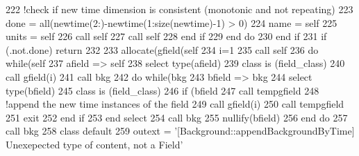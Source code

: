 \begin{DoxyCode}
222                 \textcolor{comment}{!check if new time dimension is consistent (monotonic and not repeating)}
223                 done = all(newtime(2:)-newtime(1:\textcolor{keyword}{size}(newtime)-1) > 0)
224                 name = self%
225                 units = self%
226                 \textcolor{keyword}{call }self%
227                 \textcolor{keyword}{call }self%
228 \textcolor{keywordflow}{            end if}
229 \textcolor{keywordflow}{        end do}
230 \textcolor{keywordflow}{    end if}
231     \textcolor{keywordflow}{if} (.not.done) \textcolor{keywordflow}{return}
232 
233     \textcolor{keyword}{allocate}(gfield(self%
234     i=1
235     \textcolor{keyword}{call }self%
236     \textcolor{keywordflow}{do} \textcolor{keywordflow}{while}(self%
237         afield => self%
238         \textcolor{keywordflow}{select type}(afield)
239 \textcolor{keywordflow}{        class is} (field\_class)
240             \textcolor{keyword}{call }gfield(i)%
241             \textcolor{keyword}{call }bkg%
242             \textcolor{keywordflow}{do} \textcolor{keywordflow}{while}(bkg%
243                 bfield => bkg%
244                 \textcolor{keywordflow}{select type}(bfield)
245 \textcolor{keywordflow}{                class is} (field\_class)
246                     \textcolor{keywordflow}{if} (bfield%
247                         \textcolor{keyword}{call }tempgfield%
248                         \textcolor{comment}{!append the new time instances of the field}
249                         \textcolor{keyword}{call }gfield(i)%
250                         \textcolor{keyword}{call }tempgfield%
251                         \textcolor{keywordflow}{exit}
252 \textcolor{keywordflow}{                    end if}
253 \textcolor{keywordflow}{                end select}
254                 \textcolor{keyword}{call }bkg%
255                 \textcolor{keyword}{nullify}(bfield)
256 \textcolor{keywordflow}{            end do}
257             \textcolor{keyword}{call }bkg%
258 \textcolor{keywordflow}{            class default}
259             outext = \textcolor{stringliteral}{'[Background::appendBackgroundByTime] Unexepected type of content, not a Field'}

\end{DoxyCode}
